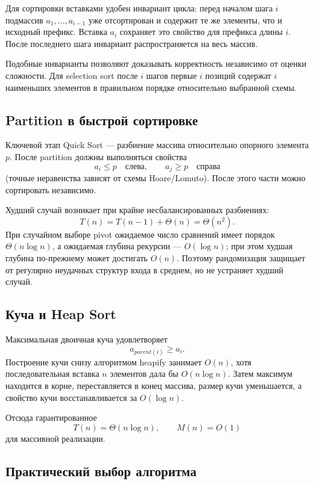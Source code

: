 Для сортировки вставками удобен инвариант цикла: перед началом шага $i$
подмассив $a_1,\ldots,a_{i-1}$ уже отсортирован и содержит те же элементы, что и
исходный префикс. Вставка $a_i$ сохраняет это свойство для префикса длины $i$.
После последнего шага инвариант распространяется на весь массив.

Подобные инварианты позволяют доказывать корректность независимо от оценки
сложности. Для selection sort после $i$ шагов первые $i$ позиций содержат $i$
наименьших элементов в правильном порядке относительно выбранной схемы.

\subsection{Partition в быстрой сортировке}

Ключевой этап Quick Sort --- разбиение массива относительно опорного элемента
$p$. После partition должны выполняться свойства
\[
a_i\le p\quad\text{слева},\qquad
a_j\ge p\quad\text{справа}
\]
(точные неравенства зависят от схемы Hoare/Lomuto). После этого части можно
сортировать независимо.

Худший случай возникает при крайне несбалансированных разбиениях:
\[
T(n)=T(n-1)+\Theta(n)=\Theta(n^2).
\]
При случайном выборе pivot ожидаемое число сравнений имеет порядок
$\Theta(n\log n)$, а ожидаемая глубина рекурсии --- $O(\log n)$; при этом
худшая глубина по-прежнему может достигать $O(n)$. Поэтому рандомизация защищает
от регулярно неудачных структур входа в среднем, но не устраняет худший случай.

\subsection{Куча и Heap Sort}

Максимальная двоичная куча удовлетворяет
\[
a_{parent(i)}\ge a_i.
\]
Построение кучи снизу алгоритмом heapify занимает $O(n)$, хотя последовательная
вставка $n$ элементов дала бы $O(n\log n)$. Затем максимум находится в корне,
переставляется в конец массива, размер кучи уменьшается, а свойство кучи
восстанавливается за $O(\log n)$.

Отсюда гарантированное
\[
T(n)=\Theta(n\log n),\qquad M(n)=O(1)
\]
для массивной реализации.

\subsection{Практический выбор алгоритма}

